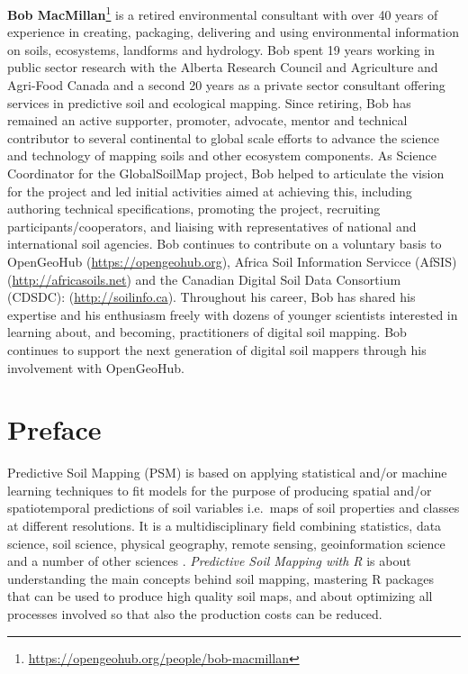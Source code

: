 \documentclass[graybox,natbib,nospthms,UStrade]{svmono}
\renewcommand{\href}[2]{#2 (\url{#1})}
\renewcommand{\href}[2]{#2\footnote{\url{#1}}}
\begin{document}
\href{https://opengeohub.org/people/bob-macmillan}{\textbf{Bob MacMillan}} is a retired environmental consultant with over 40 years of experience in creating, packaging, delivering and using environmental information on soils, ecosystems, landforms and hydrology. Bob spent 19 years working in public sector research with the Alberta Research Council and Agriculture and Agri-Food Canada and a second 20 years as a private sector consultant offering services in predictive soil and ecological mapping. Since retiring, Bob has remained an active supporter, promoter, advocate, mentor and technical contributor to several continental to global scale efforts to advance the science and technology of mapping soils and other ecosystem components. As Science Coordinator for the GlobalSoilMap project, Bob helped to articulate the vision for the project and led initial activities aimed at achieving this, including authoring technical specifications, promoting the project, recruiting participants/cooperators, and liaising with representatives of national and international soil agencies. Bob continues to contribute on a voluntary basis to OpenGeoHub (\url{https://opengeohub.org}), Africa Soil Information Servicce (AfSIS) (\url{http://africasoils.net}) and the Canadian Digital Soil Data Consortium (CDSDC): (\url{http://soilinfo.ca}). Throughout his career, Bob has shared his expertise and his enthusiasm freely with dozens of younger scientists interested in learning about, and becoming, practitioners of digital soil mapping. Bob continues to support the next generation of digital soil mappers through his involvement with OpenGeoHub.

\hypertarget{preface}{%
\chapter*{Preface}\label{preface}}

Predictive Soil Mapping (PSM) is based on applying statistical and/or machine learning techniques to fit models for the purpose of producing spatial and/or spatiotemporal predictions of soil variables i.e.~maps of soil properties and classes at different resolutions. It is a multidisciplinary field combining statistics, data science, soil science, physical geography, remote sensing, geoinformation science and a number of other sciences \citep{Scul01, MCBRATNEY20033, Henderson2004Geoderma, Boettinger2010Springer, Zhu2015PSM}. \emph{Predictive Soil Mapping with R} is about understanding the main concepts behind soil mapping, mastering R packages that can be used to produce high quality soil maps, and about optimizing all processes involved so that also the production costs can be reduced.
\end{document}
